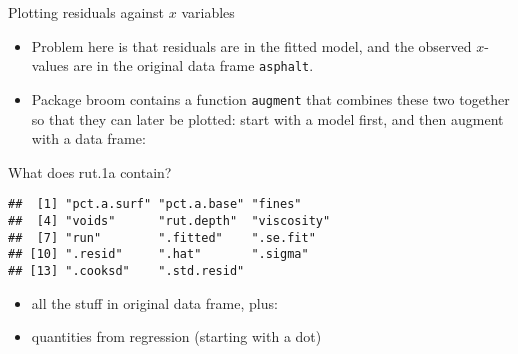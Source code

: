 \begin{frame}[fragile]{Plotting residuals against \(x\) variables}
\protect\hypertarget{plotting-residuals-against-x-variables}{}
\begin{itemize}
\tightlist
\item
  Problem here is that residuals are in the fitted model, and the
  observed \(x\)-values are in the original data frame \texttt{asphalt}.
\item
  Package broom contains a function \texttt{augment} that combines these
  two together so that they can later be plotted: start with a model
  first, and then augment with a data frame:
\end{itemize}

\begin{Shaded}
\begin{Highlighting}[]
 \OperatorTok{\%\textgreater{}\%}\StringTok{ }\StringTok{ }
\end{Highlighting}
\end{Shaded}
\end{frame}

\begin{frame}[fragile]{What does rut.1a contain?}
\protect\hypertarget{what-does-rut.1a-contain}{}
\begin{Shaded}
\begin{Highlighting}[]
\end{Highlighting}
\end{Shaded}

\begin{verbatim}
##  [1] "pct.a.surf" "pct.a.base" "fines"     
##  [4] "voids"      "rut.depth"  "viscosity" 
##  [7] "run"        ".fitted"    ".se.fit"   
## [10] ".resid"     ".hat"       ".sigma"    
## [13] ".cooksd"    ".std.resid"
\end{verbatim}

\begin{itemize}
\tightlist
\item
  all the stuff in original data frame, plus:
\item
  quantities from regression (starting with a dot)
\end{itemize}
\end{frame}


